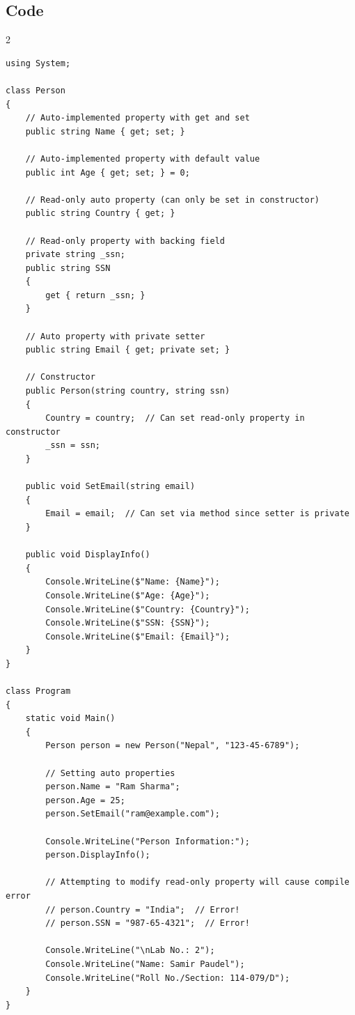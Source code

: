 \documentclass[10pt,a4paper]{article}
\begin{document}
\subsection*{Code}
\begin{multicols}{2}
\begin{lstlisting}
using System;

class Person
{
    // Auto-implemented property with get and set
    public string Name { get; set; }
    
    // Auto-implemented property with default value
    public int Age { get; set; } = 0;
    
    // Read-only auto property (can only be set in constructor)
    public string Country { get; }
    
    // Read-only property with backing field
    private string _ssn;
    public string SSN 
    { 
        get { return _ssn; } 
    }
    
    // Auto property with private setter
    public string Email { get; private set; }
    
    // Constructor
    public Person(string country, string ssn)
    {
        Country = country;  // Can set read-only property in constructor
        _ssn = ssn;
    }
    
    public void SetEmail(string email)
    {
        Email = email;  // Can set via method since setter is private
    }
    
    public void DisplayInfo()
    {
        Console.WriteLine($"Name: {Name}");
        Console.WriteLine($"Age: {Age}");
        Console.WriteLine($"Country: {Country}");
        Console.WriteLine($"SSN: {SSN}");
        Console.WriteLine($"Email: {Email}");
    }
}

class Program
{
    static void Main()
    {
        Person person = new Person("Nepal", "123-45-6789");
        
        // Setting auto properties
        person.Name = "Ram Sharma";
        person.Age = 25;
        person.SetEmail("ram@example.com");
        
        Console.WriteLine("Person Information:");
        person.DisplayInfo();
        
        // Attempting to modify read-only property will cause compile error
        // person.Country = "India";  // Error!
        // person.SSN = "987-65-4321";  // Error!
        
        Console.WriteLine("\nLab No.: 2");
        Console.WriteLine("Name: Samir Paudel");
        Console.WriteLine("Roll No./Section: 114-079/D");
    }
}
\end{lstlisting}
\end{multicols}
\end{document}
